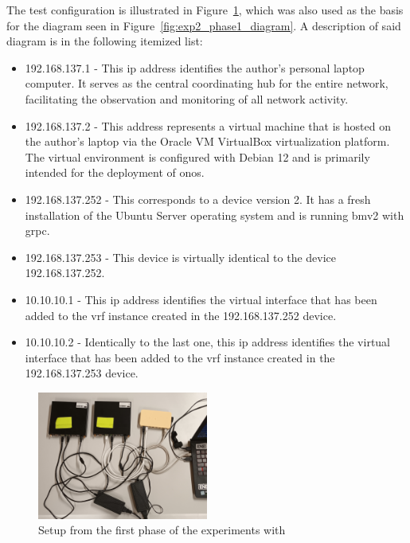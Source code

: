 The test configuration is illustrated in Figure~\ref{fig:exp2_phase1_setup}, which was also used as the basis for the diagram seen in Figure~\ref{fig:exp2_phase1_diagram}. A description of said diagram is in the following itemized list:
\begin{itemize}
	\item 192.168.137.1 - This \gls{ip} address identifies the author's personal laptop computer. It serves as the central coordinating hub for the entire network, facilitating the observation and monitoring of all network activity.
	\item 192.168.137.2 - This address represents a virtual machine that is hosted on the author's laptop via the Oracle VM VirtualBox virtualization platform. The virtual environment is configured with Debian 12 and is primarily intended for the deployment of \gls{onos}.
	\item 192.168.137.252 - This corresponds to a device version 2. It has a fresh installation of the Ubuntu Server operating system and is running \gls{bmv2} with grpc.
	\item 192.168.137.253 - This device is virtually identical to the device 192.168.137.252.
	\item 10.10.10.1 - This \gls{ip} address identifies the virtual interface that has been added to the \gls{vrf} instance created in the 192.168.137.252 device.
	\item 10.10.10.2 - Identically to the last one, this \gls{ip} address identifies the virtual interface that has been added to the \gls{vrf} instance created in the 192.168.137.253 device.
\end{itemize}

\begin{figure}
	\centering
	\includegraphics[width=0.5\textwidth]{Chapters/Figures/tests/bmv2_phase_1/20241122_185833.jpg}
	\caption{Setup from the first phase of the experiments with }
	\label{fig:exp2_phase1_setup}
\end{figure}


